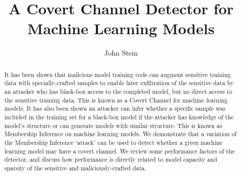 \documentclass[sigconf]{acmart}
\begin{document}
\title{A Covert Channel Detector for Machine Learning Models}


\author{John Stein}




\begin{abstract}
It has been shown that malicious model training code can augment sensitive training data with specially-crafted samples to enable later exfiltration of the sensitive data by an attacker who has black-box access to the completed model, but no direct access to the sensitive training data. \cite{DBLP:journals/corr/abs-1709-07886}  This is known as a Covert Channel for machine learning models.  It has also been shown an attacker can infer whether a specific sample was included in the training set for a black-box model if the attacker has knowledge of the model's structure or can generate models with similar structure. \cite{DBLP:journals/corr/ShokriSS16}  This is known as Membership Inference on machine learning models.  We demonstrate that a variation of the Membership Inference `attack' can be used to detect whether a given machine learning model may have a covert channel.  We review some performance factors of the detector, and discuss how performance is directly related to model capacity and sparsity of the sensitive and maliciously-crafted data.
\end{abstract}



\maketitle





\end{document}
